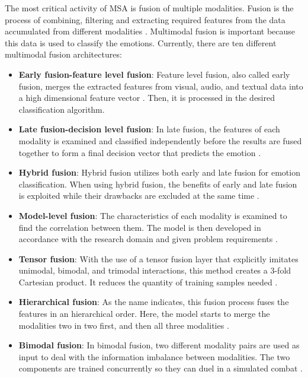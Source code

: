 The most critical activity of MSA is fusion of multiple modalities. Fusion is the process of combining, filtering and extracting required features from the data accumulated from different modalities \cite{MSA-review-3-9686504}. Multimodal fusion is important because this data is used to classify the emotions. Currently, there are ten different multimodal fusion architectures:
%
\begin{itemize}
    \item \textbf{Early fusion-feature level fusion}: Feature level fusion, also called early fusion, merges the extracted features from visual, audio, and textual data into a high dimensional feature vector \cite{MSA_review2_GANDHI2023424}. Then, it is processed in the desired classification algorithm. \\
    \item \textbf{Late fusion-decision level fusion}: In late fusion, the features of each modality is examined and classified independently before the results are fused together to form a final decision vector that predicts the emotion \cite{MSA-review-3-9686504}. \\
    \item \textbf{Hybrid fusion}: Hybrid fusion utilizes both early and late fusion for emotion classification. When using hybrid fusion, the benefits of early and late fusion is exploited while their drawbacks are excluded at the same time \cite{MSA-review-3-9686504}.\\
    \item \textbf{Model-level fusion}: The characteristics of each modality is examined to find the correlation between them. The model is then developed in accordance with the research domain and given problem requirements \cite{MSA-review-3-9686504}. \\
    \item \textbf{Tensor fusion}: With the use of a tensor fusion layer that explicitly imitates unimodal, bimodal, and trimodal interactions, this method creates a 3-fold Cartesian product. It reduces the quantity of training samples needed \cite{MSA_review2_GANDHI2023424}. \\
    \item \textbf{Hierarchical fusion}: As the name indicates, this fusion process fuses the features in an hierarchical order. Here, the model starts to merge the modalities two in two first, and then all three modalities \cite{MSA_review2_GANDHI2023424}. \\
    \item \textbf{Bimodal fusion}: In bimodal fusion, two different modality pairs are used as input to deal with the information imbalance between modalities. The two components are trained concurrently so they can duel in a simulated combat \cite{MSA_review2_GANDHI2023424}. \\

\end{itemize}
